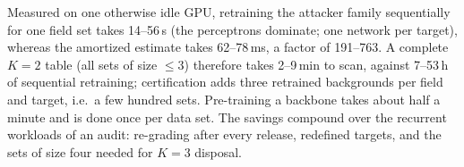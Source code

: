 Measured on one otherwise idle GPU, retraining the attacker family sequentially for one field set takes 14--56\,s (the perceptrons dominate; one network per target), whereas the amortized estimate takes 62--78\,ms, a factor of 191--763. A complete $K=2$ table (all sets of size $\le3$) therefore takes 2--9\,min to scan, against 7--53\,h of sequential retraining; certification adds three retrained backgrounds per field and target, i.e.\ a few hundred sets. Pre-training a backbone takes about half a minute and is done once per data set. The savings compound over the recurrent workloads of an audit: re-grading after every release, redefined targets, and the sets of size four needed for $K=3$ disposal.
